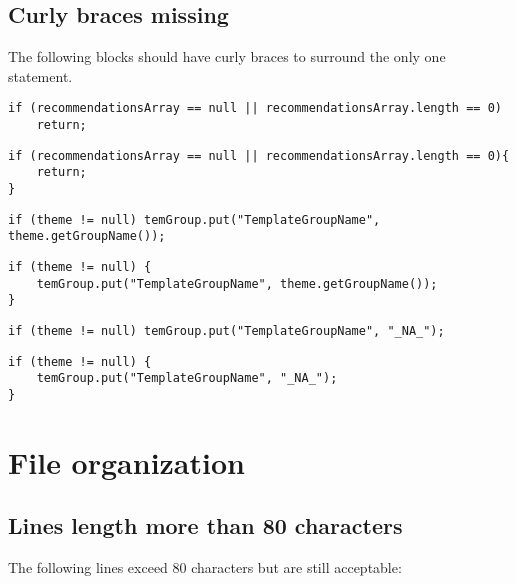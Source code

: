 \subsection{Curly braces missing}
The following  blocks should have curly braces to surround the only one statement.
\begin{lstlisting}[firstnumber=105, caption={Issue}]
if (recommendationsArray == null || recommendationsArray.length == 0)
	return;
\end{lstlisting}
\begin{lstlisting}[firstnumber=105, caption={Possible solution}]
if (recommendationsArray == null || recommendationsArray.length == 0){
    return;
}
\end{lstlisting}
\noindent\makebox[\linewidth]{\rule{\linewidth}{0.4pt}}
\begin{lstlisting}[firstnumber=271, caption={Issue}]
if (theme != null) temGroup.put("TemplateGroupName", theme.getGroupName());
\end{lstlisting}
\begin{lstlisting}[firstnumber=271, caption={Possible solution}]
if (theme != null) {
	temGroup.put("TemplateGroupName", theme.getGroupName());
}
\end{lstlisting}
\noindent\makebox[\linewidth]{\rule{\linewidth}{0.4pt}}
\begin{lstlisting}[firstnumber=274, caption={Issue}]
if (theme != null) temGroup.put("TemplateGroupName", "_NA_");
\end{lstlisting}
\begin{lstlisting}[firstnumber=274, caption={Possible solution}]
if (theme != null) {
	temGroup.put("TemplateGroupName", "_NA_");
}
\end{lstlisting}


\section{File organization}

\subsection{Lines length more than 80 characters}
The following lines exceed 80 characters but are still acceptable:

